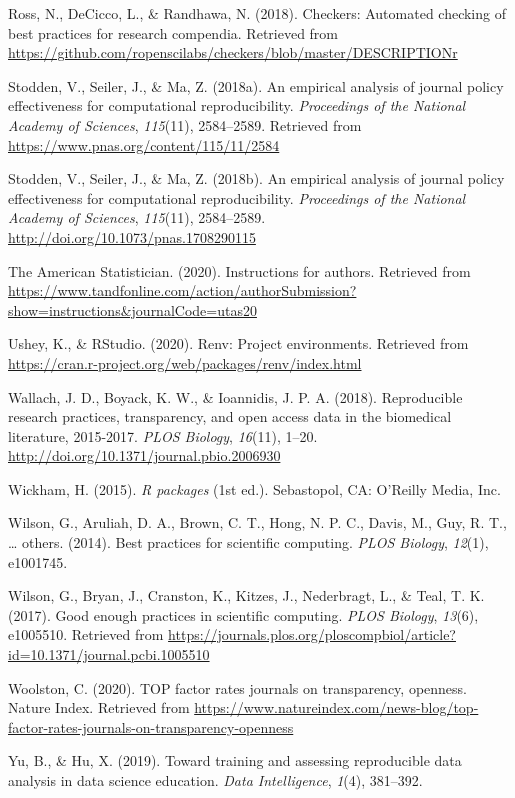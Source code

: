 \documentclass[12pt,twoside]{reedthesis}
\begin{document}
\leavevmode\hypertarget{ref-R-checkers}{}%
Ross, N., DeCicco, L., \& Randhawa, N. (2018). Checkers: Automated checking of best practices for research compendia. Retrieved from \url{https://github.com/ropenscilabs/checkers/blob/master/DESCRIPTIONr}

\leavevmode\hypertarget{ref-policy-effectiveness}{}%
Stodden, V., Seiler, J., \& Ma, Z. (2018a). An empirical analysis of journal policy effectiveness for computational reproducibility. \emph{Proceedings of the National Academy of Sciences}, \emph{115}(11), 2584--2589. Retrieved from \url{https://www.pnas.org/content/115/11/2584}

\leavevmode\hypertarget{ref-Stodden2584}{}%
Stodden, V., Seiler, J., \& Ma, Z. (2018b). An empirical analysis of journal policy effectiveness for computational reproducibility. \emph{Proceedings of the National Academy of Sciences}, \emph{115}(11), 2584--2589. \url{http://doi.org/10.1073/pnas.1708290115}

\leavevmode\hypertarget{ref-ams-guide}{}%
The American Statistician. (2020). Instructions for authors. Retrieved from \url{https://www.tandfonline.com/action/authorSubmission?show=instructions\&journalCode=utas20}

\leavevmode\hypertarget{ref-R-renv}{}%
Ushey, K., \& RStudio. (2020). Renv: Project environments. Retrieved from \url{https://cran.r-project.org/web/packages/renv/index.html}

\leavevmode\hypertarget{ref-plos-biology}{}%
Wallach, J. D., Boyack, K. W., \& Ioannidis, J. P. A. (2018). Reproducible research practices, transparency, and open access data in the biomedical literature, 2015-2017. \emph{PLOS Biology}, \emph{16}(11), 1--20. \url{http://doi.org/10.1371/journal.pbio.2006930}

\leavevmode\hypertarget{ref-hadley-packages}{}%
Wickham, H. (2015). \emph{R packages} (1st ed.). Sebastopol, CA: O'Reilly Media, Inc.

\leavevmode\hypertarget{ref-wilson2014best}{}%
Wilson, G., Aruliah, D. A., Brown, C. T., Hong, N. P. C., Davis, M., Guy, R. T., \ldots{} others. (2014). Best practices for scientific computing. \emph{PLOS Biology}, \emph{12}(1), e1001745.

\leavevmode\hypertarget{ref-wilson2017good}{}%
Wilson, G., Bryan, J., Cranston, K., Kitzes, J., Nederbragt, L., \& Teal, T. K. (2017). Good enough practices in scientific computing. \emph{PLOS Biology}, \emph{13}(6), e1005510. Retrieved from \url{https://journals.plos.org/ploscompbiol/article?id=10.1371/journal.pcbi.1005510}

\leavevmode\hypertarget{ref-top-guidelines}{}%
Woolston, C. (2020). TOP factor rates journals on transparency, openness. Nature Index. Retrieved from \url{https://www.natureindex.com/news-blog/top-factor-rates-journals-on-transparency-openness}

\leavevmode\hypertarget{ref-yu2019toward}{}%
Yu, B., \& Hu, X. (2019). Toward training and assessing reproducible data analysis in data science education. \emph{Data Intelligence}, \emph{1}(4), 381--392.


\end{document}
